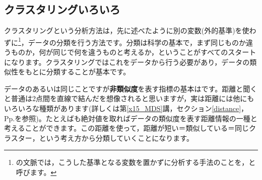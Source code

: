 \documentclass{ltjsbook}
\begin{document}
\subsection{クラスタリングいろいろ}
クラスタリングという分析方法は，先に述べたように別の変数(外的基準)を使わずに\footnote{の文脈では，こうした基準となる変数を置かずに分析する手法のことを，と呼びます。}，データの分類を行う方法です。分類は科学の基本で，まず同じものか違うものか，何が同じで何を違うものと考えるか，ということがすべてのスタートになります。クラスタリングではこれをデータから行う必要があり，データの類似性をもとに分類することが基本です。

データのあるいは同じことですが\textbf{非類似度}を表す指標の基本はです。距離と聞くと普通は2点間を直線で結んだを想像されると思いますが，実は距離には他にもいろいろな種類があります(詳しくは第\ref{x15_MDS}講，セクション\ref{distance}，Pp.\pageref{distance}を参照)。たとえばも絶対値を取ればデータの類似度を表す距離情報の一種と考えることができます。この距離を使って，距離が短い＝類似している＝同じクラスター，という考え方から分類していくことになります。
\end{document}
